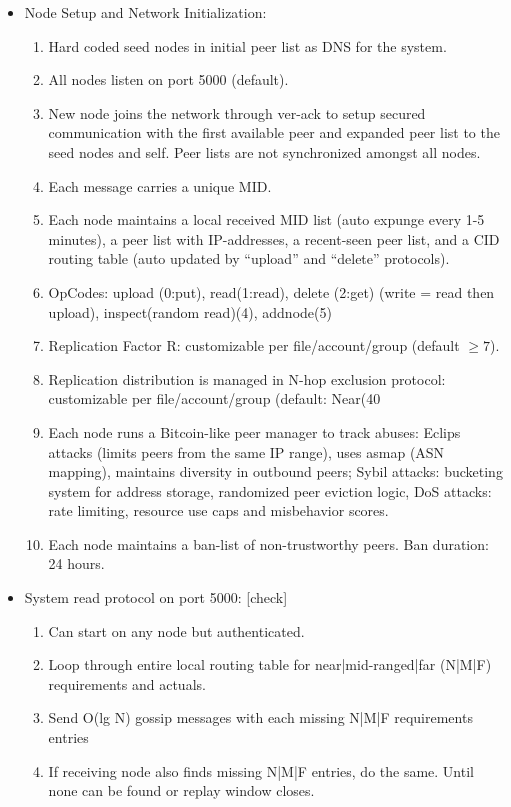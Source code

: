 \documentclass[conference]{IEEEtran}
\begin{document}
\begin{itemize}
    \item Node Setup and Network Initialization:
    \begin{enumerate}
        \item Hard coded seed nodes in initial peer list as DNS for the system.
        \item All nodes listen on port 5000 (default).
        \item New node joins the network through ver-ack to setup secured communication with the first available peer and expanded peer list to the seed nodes and self. Peer lists are not synchronized amongst all nodes.
        \item Each message carries a unique MID.
        \item Each node maintains a local received MID list (auto expunge every 1-5 minutes), a peer list with IP-addresses, a recent-seen peer list, and a CID routing table (auto updated by “upload” and “delete” protocols).
        \item OpCodes: upload (0:put), read(1:read), delete (2:get) (write = read then upload), inspect(random read)(4), addnode(5)
        \item Replication Factor R: customizable per file/account/group (default $\ge 7$).
        \item Replication distribution is managed in N-hop exclusion protocol: customizable per file/account/group (default: Near(40%
        \item Each node runs a Bitcoin-like peer manager to track abuses: Eclips attacks (limits peers from the same IP range), uses asmap (ASN mapping), maintains diversity in outbound peers; Sybil attacks: bucketing system for address storage, randomized peer eviction logic, DoS attacks: rate limiting, resource use caps and misbehavior scores.
        \item Each node maintains a ban-list of non-trustworthy peers. Ban duration: 24 hours.
    \end{enumerate}

    \item System read protocol on port 5000: [check]
    \begin{enumerate}
        \item Can start on any node but authenticated.
        \item Loop through entire local routing table for near|mid-ranged|far (N|M|F) requirements and actuals.
        \item Send O(lg N) gossip messages with each missing N|M|F requirements entries
        \item If receiving node also finds missing N|M|F entries, do the same. Until none can be found or replay window closes.
    \end{enumerate}


\end{itemize}
\end{document}

